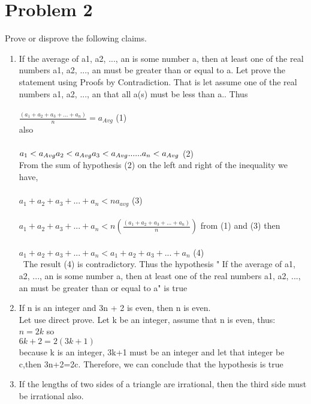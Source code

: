 \documentclass[12pt,letterpaper]{article}
\begin{document}
\section*{Problem 2}
Prove or disprove the following claims.
\begin{enumerate}
\item  If the average of a1, a2, ..., an is some number a, then at least one of the real numbers a1, a2, ..., an
must be greater than or equal to a.
Let prove the statement using Proofs by Contradiction. That is  let assume
one of the real numbers a1, a2, ..., an
that all a(s) must be less than a.. Thus\\\\
\(\frac{(a_1+a_2+a_3+...+a_n)}{n}=a_{Avg}\) (1)\\ 
also \\\\
\(a_1<a_{Avg}\\ a_2< a_{Avg} \\ a_3 <a_{Avg} \\ ...\\...\\a_n <a_{Avg}\) (2)\\
From the sum of hypothesis (2) on the left and right of the inequality we have, \\\\
\(a_1+a_2+a_3+...+a_n<na_{avg}\) (3)\\\\
\(a_1+a_2+a_3+...+a_n<n(\frac{(a_1+a_2+a_3+...+a_n)}{n})\) from (1) and (3) then\\\\
\(a_1+a_2+a_3+...+a_n<a_1+a_2+a_3+...+a_n\) (4)\\\
The result (4) is contradictory. Thus the hypothesis " If the average of a1, a2, ..., an is some number a, then at least one of the real numbers a1, a2, ..., an
must be greater than or equal to a" is true
\item If n is an integer and 3n + 2 is even, then n is even.\\
Let use direct prove. Let k be an integer, assume that n is even, thus:\\
\(n=2k\) so\\
\(6k+2=2(3k+1)\)\\
because  k is an integer, 3k+1 must be an integer and let that integer be c,then
3n+2=2c. Therefore, we can conclude that the hypothesis is true
\item If the lengths of two sides of a triangle are irrational, then the third side must be irrational also.\\

\end{enumerate}
\end{document}
